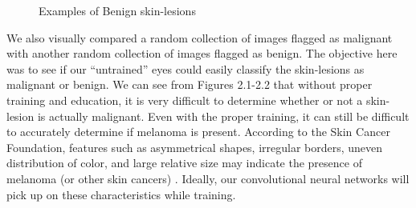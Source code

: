 \documentclass [MAS] {uclathes}
\begin{document}
\begin{figure}[hbt!]
\hspace*{\fill}
\centering
{}\hspace{0.5em}
\hspace{0.5em}
\hspace*{\fill}
\label{fig:ben_examples}
\vspace{-1cm}
\caption{Examples of Benign skin-lesions}
\end{figure}


We also visually compared a random collection of images flagged as malignant with another random collection of images flagged as benign. The objective here was to see if our ``untrained'' eyes could easily classify the skin-lesions as malignant or benign. We can see from Figures 2.1-2.2 that without proper training and education, it is very difficult to determine whether or not a skin-lesion is actually malignant. Even with the proper training, it can still be difficult to accurately determine if melanoma is present. According to the Skin Cancer Foundation, features such as asymmetrical shapes, irregular borders, uneven distribution of color, and large relative size may indicate the presence of melanoma (or other skin cancers) \cite{SCF}. Ideally, our convolutional neural networks will pick up on these characteristics while training.
\end{document}

